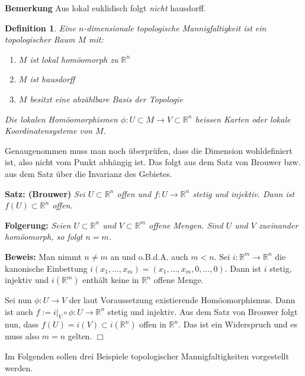 \documentclass[12pt,a4paper]{article}
\def\R{\mathbb{R}}
\newtheorem{Definition}[Lemma]{Definition}
\def\proof{\noindent\textbf{Beweis:}\quad}
\def\qed{\quad\hfill\ensuremath{\Box}}
\begin{document}
\medskip

{\bf Bemerkung} Aus lokal euklidisch folgt {\it nicht} hausdorff.

\bigskip

\begin{Definition}
Eine $n$-dimensionale {\em topologische Mannigfaltigkeit } ist ein topologischer Raum $M$ mit:
\begin{enumerate}
\item \quad $M$ ist lokal hom\"oomorph zu $\R^n$
\item \quad $M$ ist hausdorff
\item \quad $M$ besitzt eine abz\"ahlbare Basis der Topologie
\end{enumerate}

Die lokalen Hom\"oomorphismen $\phi: U \subset M \rightarrow V \subset \R^n$ heissen {\it Karten}
oder lokale Koordinatensysteme von $M$.
\end{Definition}

\medskip

Genaugenommen muss man noch \"uberpr\"ufen, dass die Dimension wohldefiniert ist, also nicht vom Punkt abh\"angig ist.
Das folgt aus dem Satz von Brouwer bzw. aus dem Satz \"uber die Invarianz des Gebietes.

\medskip

{\bf Satz: (Brouwer)} {\it Sei $U\subset \R^n $ offen und $f:U \rightarrow \R^n$ stetig und injektiv. Dann ist $f(U)\subset \R^n$
offen. }

\medskip

{\bf Folgerung:}
{\it Seien $U \subset \R^n$ und $V\subset \R^m$ offene Mengen. Sind $U$ und $V$ zueinander hom\"oomorph, so folgt
$n=m$.}

\medskip

\proof
Man nimmt $n\neq m$ an und o.B.d.A. auch $m<n$. Sei $i:\R^m\rightarrow \R^n$ die kanonische Einbettung
$i(x_1,\ldots, x_m)= (x_1,\ldots, x_m,0,\ldots,0)$. Dann ist $i$ stetig, injektiv und $i(\R^m)$ enth\"alt
keine in $\R^n$ offene Menge.

\medskip

Sei nun $\phi : U \rightarrow V$ der laut Voraussetzung existierende Hom\"oomorphismus. Dann ist auch
$f:= i|_V \circ \phi : U \rightarrow \R^n$ stetig und injektiv. Aus dem Satz von Brouwer folgt nun, dass
$f(U) = i(V) \subset i(\R^n)$ offen in $\R^n$. Das ist ein Widerspruch und es muss also $m=n$ gelten.
\qed

\bigskip

Im Folgenden sollen drei Beispiele topologischer Mannigfaltigkeiten vorgestellt werden.
\end{document}
